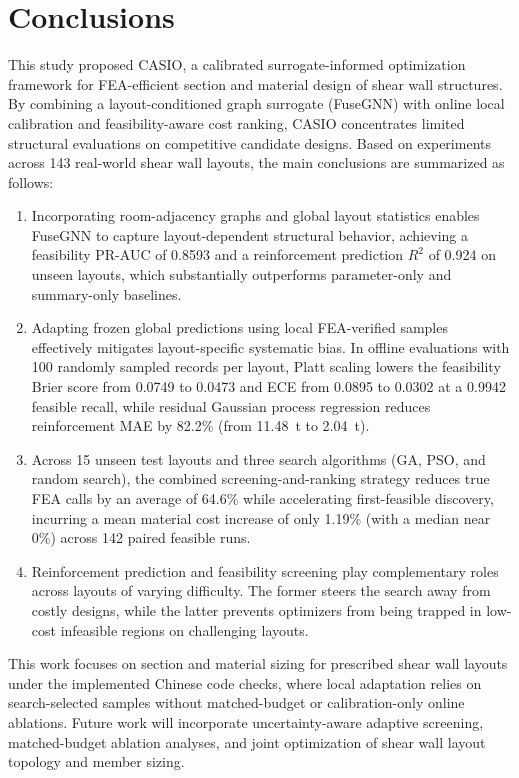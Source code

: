 \section{Conclusions}
\label{sec:conclusion}

This study proposed CASIO, a calibrated surrogate-informed optimization framework for FEA-efficient section and material design of shear wall structures. By combining a layout-conditioned graph surrogate (FuseGNN) with online local calibration and feasibility-aware cost ranking, CASIO concentrates limited structural evaluations on competitive candidate designs. Based on experiments across 143 real-world shear wall layouts, the main conclusions are summarized as follows:

\begin{enumerate}[(1)]
\item Incorporating room-adjacency graphs and global layout statistics enables FuseGNN to capture layout-dependent structural behavior, achieving a feasibility PR-AUC of 0.8593 and a reinforcement prediction $R^2$ of 0.924 on unseen layouts, which substantially outperforms parameter-only and summary-only baselines.

\item Adapting frozen global predictions using local FEA-verified samples effectively mitigates layout-specific systematic bias. In offline evaluations with 100 randomly sampled records per layout, Platt scaling lowers the feasibility Brier score from 0.0749 to 0.0473 and ECE from 0.0895 to 0.0302 at a 0.9942 feasible recall, while residual Gaussian process regression reduces reinforcement MAE by 82.2\% (from 11.48~t to 2.04~t).

\item Across 15 unseen test layouts and three search algorithms (GA, PSO, and random search), the combined screening-and-ranking strategy reduces true FEA calls by an average of 64.6\% while accelerating first-feasible discovery, incurring a mean material cost increase of only 1.19\% (with a median near 0\%) across 142 paired feasible runs.

\item Reinforcement prediction and feasibility screening play complementary roles across layouts of varying difficulty. The former steers the search away from costly designs, while the latter prevents optimizers from being trapped in low-cost infeasible regions on challenging layouts.
\end{enumerate}

This work focuses on section and material sizing for prescribed shear wall layouts under the implemented Chinese code checks, where local adaptation relies on search-selected samples without matched-budget or calibration-only online ablations. Future work will incorporate uncertainty-aware adaptive screening, matched-budget ablation analyses, and joint optimization of shear wall layout topology and member sizing.